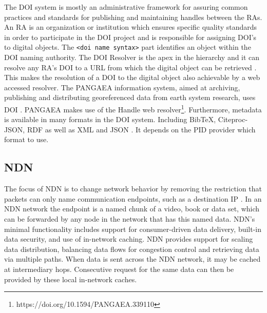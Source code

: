 The DOI system is mostly an administrative framework for assuring common practices and standards for publishing and maintaining handles between the RAs. An RA is an organization or institution which ensures specific quality standards in order to participate in the DOI project and is responsible for assigning DOI's to digital objects. The \texttt{<doi name syntax>} part identifies an object within the DOI naming authority. The DOI Resolver is the apex in the hierarchy and it can resolve any RA's DOI to a URL from which the digital object can be retrieved \cite{icn-bd}. This makes the resolution of a DOI to the digital object also achievable by a web accessed resolver. The PANGAEA information system, aimed at archiving, publishing and distributing georeferenced data from earth system research, uses DOI \cite{pang}. PANGAEA makes use of the Handle web resolver\footnote{https://doi.org/10.1594/PANGAEA.339110}.
Furthermore, metadata is available in many formats in the DOI system. Including BibTeX, Citeproc-JSON, RDF as well as XML and JSON \cite{doi-met}. It depends on the PID provider which format to use.

\subsection{NDN}
\label{overview-ndn}
The focus of NDN is to change network behavior by removing the restriction that packets can only name communication endpoints, such as a destination IP \cite{ndn-summary}. In an NDN network the endpoint is a named chunk of a video, book or data set, which can be forwarded by any node in the network that has this named data. NDN’s minimal functionality includes support for consumer-driven data delivery, built-in data security, and use of in-network caching. NDN provides support for scaling data distribution, balancing data flows for congestion control and retrieving data via multiple paths. When data is sent across the NDN network, it may be cached at intermediary hops. Consecutive request for the same data can then be provided by these local in-network caches.


